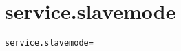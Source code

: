 \section{service.slavemode}
\label{configuration:ServiceSlavemode}
\ClearAPI
\TODO
{}
\begin{lstlisting}[style=Props,caption={Usage example for \textit{service.slavemode}}]
service.slavemode=
\end{lstlisting}